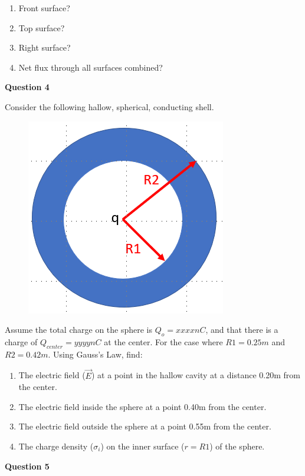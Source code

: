 \documentclass[14pt]{report}
\begin{document}
\begin{enumerate}[label=\Alph*]
\item Front surface?
\item Top surface?
\item Right surface?
\item Net flux through all surfaces combined?
\end{enumerate}

\textbf{Question 4} 

Consider the following hallow, spherical, conducting shell. 

\begin{figure}[H]
\begin{center}
\includegraphics[scale=0.40]{exam1_5.png}
\end{center}
\end{figure}
Assume the total charge on the sphere is $Q_o = xxxx nC$, and that there is a charge of $Q_{center} = yyyy nC$ at the center. For the case where $R1 = 0.25m$ and $R2 = 0.42m$. Using Gauss's Law, find:

\begin{enumerate}[label=\Alph*]
\item The electric field ($\vec{E}$) at a point in the hallow cavity at a distance 0.20m from the center.
\item The electric field inside the sphere at a point 0.40m from the center. 
\item The electric field outside the sphere at a point 0.55m from the center. 
\item The charge density ($\sigma_i$) on the inner surface ($r = R1$) of the sphere.
\end{enumerate}

\newpage
\textbf{Question 5} 
\end{document}

